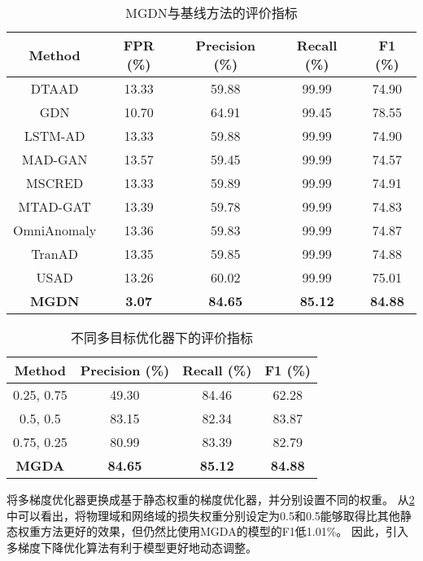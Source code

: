 \begin{table}[ht]
    \centering
    \caption{MGDN与基线方法的评价指标}
    \label{table:matrics of mgdn and the baseline methods}
    \begin{tabular}{ccccc}
        \toprule
        \textbf{Method} & \textbf{FPR (\%)} & \textbf{Precision (\%)} & \textbf{Recall (\%)} & \textbf{F1 (\%)} \\
        \midrule
        DTAAD       & 13.33 & 59.88 & 99.99 & 74.90 \\
        GDN         & 10.70 & 64.91 & 99.45 & 78.55 \\
        LSTM-AD     & 13.33 & 59.88 & 99.99 & 74.90 \\
        MAD-GAN     & 13.57 & 59.45 & 99.99 & 74.57 \\
        MSCRED      & 13.33 & 59.89 & 99.99 & 74.91 \\
        MTAD-GAT    & 13.39 & 59.78 & 99.99 & 74.83 \\
        OmniAnomaly & 13.36 & 59.83 & 99.99 & 74.87 \\
        TranAD      & 13.35 & 59.85 & 99.99 & 74.88 \\
        USAD        & 13.26 & 60.02 & 99.99 & 75.01 \\
        \textbf{MGDN}   & \textbf{3.07} & \textbf{84.65} & \textbf{85.12} & \textbf{84.88} \\
        \bottomrule
    \end{tabular}
\end{table}

\begin{table}[!ht]
    \centering
    \caption{不同多目标优化器下的评价指标}
    \label{table:matrics of opt}
    \begin{tabular}{cccc}
        \toprule
        \textbf{Method} & \textbf{Precision (\%)} & \textbf{Recall (\%)} & \textbf{F1 (\%)} \\
        \midrule
        0.25, 0.75  & 49.30 & 84.46 & 62.28 \\
        0.5, 0.5    & 83.15 & 82.34 & 83.87 \\
        0.75, 0.25  & 80.99 & 83.39 & 82.79 \\
        \textbf{MGDA}        & \textbf{84.65} & \textbf{85.12} & \textbf{84.88} \\
        \bottomrule
    \end{tabular}
\end{table}

将多梯度优化器更换成基于静态权重的梯度优化器，并分别设置不同的权重。
从\cref{table:matrics of opt}中可以看出，将物理域和网络域的损失权重分别设定为0.5和0.5能够取得比其他静态权重方法更好的效果，但仍然比使用MGDA的模型的F1低1.01\%。
因此，引入多梯度下降优化算法有利于模型更好地动态调整。
